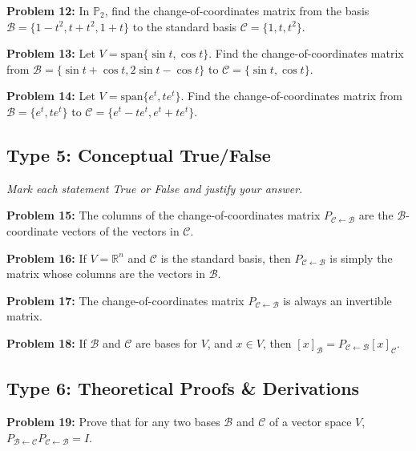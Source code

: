 \documentclass[11pt]{article}
\begin{document}
\vspace{0.5cm}
\textbf{Problem 12:} In $\mathbb{P}_2$, find the change-of-coordinates matrix from the basis $\mathcal{B} = \{1-t^2, t+t^2, 1+t\}$ to the standard basis $\mathcal{C} = \{1, t, t^2\}$.

\vspace{0.5cm}
\textbf{Problem 13:} Let $V = \text{span}\{\sin t, \cos t\}$. Find the change-of-coordinates matrix from $\mathcal{B} = \{\sin t + \cos t, 2\sin t - \cos t\}$ to $\mathcal{C} = \{\sin t, \cos t\}$.

\vspace{0.5cm}
\textbf{Problem 14:} Let $V = \text{span}\{e^t, te^t\}$. Find the change-of-coordinates matrix from $\mathcal{B} = \{e^t, te^t\}$ to $\mathcal{C} = \{e^t - te^t, e^t + te^t\}$.

\subsection*{Type 5: Conceptual True/False}
\textit{Mark each statement True or False and justify your answer.}

\vspace{0.5cm}
\textbf{Problem 15:} The columns of the change-of-coordinates matrix $P_{\mathcal{C} \leftarrow \mathcal{B}}$ are the $\mathcal{B}$-coordinate vectors of the vectors in $\mathcal{C}$.

\vspace{0.5cm}
\textbf{Problem 16:} If $V = \mathbb{R}^n$ and $\mathcal{C}$ is the standard basis, then $P_{\mathcal{C} \leftarrow \mathcal{B}}$ is simply the matrix whose columns are the vectors in $\mathcal{B}$.

\vspace{0.5cm}
\textbf{Problem 17:} The change-of-coordinates matrix $P_{\mathcal{C} \leftarrow \mathcal{B}}$ is always an invertible matrix.

\vspace{0.5cm}
\textbf{Problem 18:} If $\mathcal{B}$ and $\mathcal{C}$ are bases for $V$, and $x \in V$, then $[x]_{\mathcal{B}} = P_{\mathcal{C} \leftarrow \mathcal{B}} [x]_{\mathcal{C}}$.

\subsection*{Type 6: Theoretical Proofs \& Derivations}
\textbf{Problem 19:} Prove that for any two bases $\mathcal{B}$ and $\mathcal{C}$ of a vector space $V$, $P_{\mathcal{B} \leftarrow \mathcal{C}} P_{\mathcal{C} \leftarrow \mathcal{B}} = I$.
\end{document}
